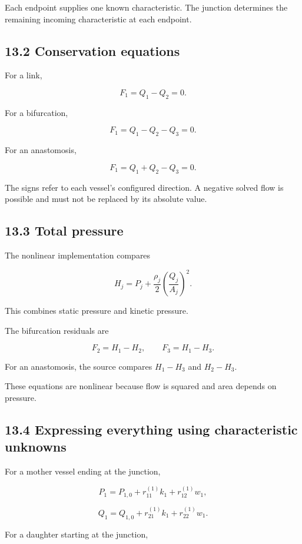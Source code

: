 \documentclass[11pt,a4paper]{article}
\begin{document}
Each endpoint supplies one known characteristic. The junction determines the remaining incoming characteristic at each endpoint.

\subsection{13.2 Conservation equations}
For a link,


\begingroup\small
\[
F_1=Q_1-Q_2=0.
\]
\endgroup


For a bifurcation,


\begingroup\small
\[
F_1=Q_1-Q_2-Q_3=0.
\]
\endgroup


For an anastomosis,


\begingroup\small
\[
F_1=Q_1+Q_2-Q_3=0.
\]
\endgroup


The signs refer to each vessel's configured direction. A negative solved flow is possible and must not be replaced by its absolute value.

\subsection{13.3 Total pressure}
The nonlinear implementation compares


\begingroup\small
\[
H_j=P_j+\frac{\rho_j}{2}
\left(\frac{Q_j}{A_j}\right)^2.
\]
\endgroup


This combines static pressure and kinetic pressure.

The bifurcation residuals are


\begingroup\small
\[
F_2=H_1-H_2,\qquad F_3=H_1-H_3.
\]
\endgroup


For an anastomosis, the source compares \(H_1-H_3\) and \(H_2-H_3\).

These equations are nonlinear because flow is squared and area depends on pressure.

\subsection{13.4 Expressing everything using characteristic unknowns}
For a mother vessel ending at the junction,


\begingroup\small
\[
P_1=P_{1,0}+r_{11}^{(1)}k_1+r_{12}^{(1)}w_1,
\]
\endgroup



\begingroup\small
\[
Q_1=Q_{1,0}+r_{21}^{(1)}k_1+r_{22}^{(1)}w_1.
\]
\endgroup


For a daughter starting at the junction,
\end{document}
